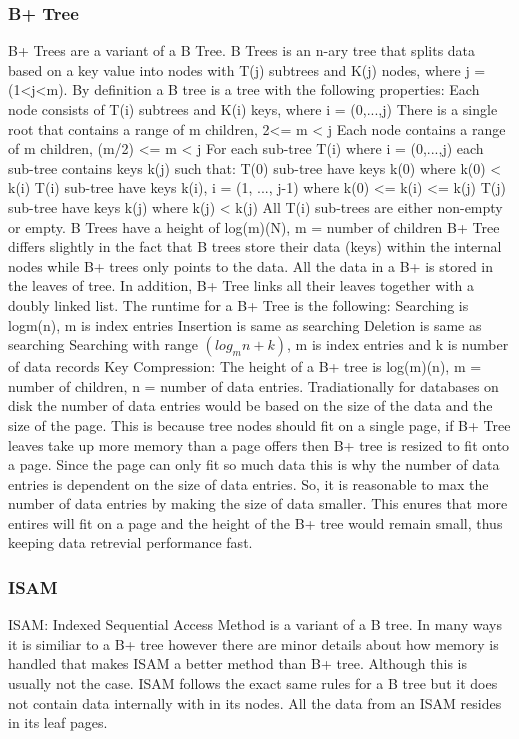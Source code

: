 \documentclass[letterpaper, 12pt]{article}
\begin{document}
\subsubsection{B+ Tree}
B+ Trees are a variant of a B Tree. B Trees is an n-ary tree that splits data
	based on a key value into nodes with T(j) subtrees and K(j) nodes, where j = (1<j<m).
	By definition a B tree is a tree with the following properties:
	Each node consists of T(i) subtrees and K(i) keys, where i = (0,...,j)
	There is a single root that contains a range of m children, 2<= m < j
	Each node contains a range of m children, (m/2) <= m < j
	For each sub-tree T(i) where i = (0,...,j) each sub-tree contains keys k(j) such that:
		T(0) sub-tree have keys k(0) where k(0) < k(i)
		T(i) sub-tree have keys k(i), i = (1, ..., j-1) where k(0) <= k(i) <= k(j)
		T(j) sub-tree have keys k(j) where k(j) < k(j)
	All T(i) sub-trees are either non-empty or empty.
	B Trees have a height of log(m)(N), m = number of children
B+ Tree differs slightly in the fact that B trees store their data (keys) within the internal nodes while 
B+ trees only points to the data. All the data in a B+ is stored in the leaves of tree. In addition, 
B+ Tree links all their leaves together with a doubly linked list.
The runtime for a B+ Tree is the following:
Searching is logm(n), m is index entries
Insertion is same as searching
Deletion is same as searching
Searching with range $( log_m n + k) $, m is index entries and k is number of data records
Key Compression:
The height of a B+ tree is log(m)(n), m = number of children, n = number of data entries.
Tradiationally for databases on disk the number of data entries would be based on the size of the data and
the size of the page. This is because tree nodes should fit on a single page, if B+ Tree leaves take up more 
memory than a page offers then B+ tree is resized to fit onto a page. Since the page can only fit so much 
data this is why the number of data entries is dependent on the size of data entries. So, it is reasonable 
to max the number of data entries by making the size of data smaller. This enures that more entires will 
fit on a page and the height of the B+ tree would remain small, thus keeping data retrevial performance fast.

\subsubsection{ISAM}
ISAM:
Indexed Sequential Access Method is a variant of a B tree. In many ways it is similiar to a B+ tree however there are minor details about how memory is handled
that makes ISAM a better method than B+ tree. Although this is usually not the case. ISAM follows the exact same rules for a B tree but it does not contain 
data internally with in its nodes. All the data from an ISAM resides in its leaf pages.
\end{document}
